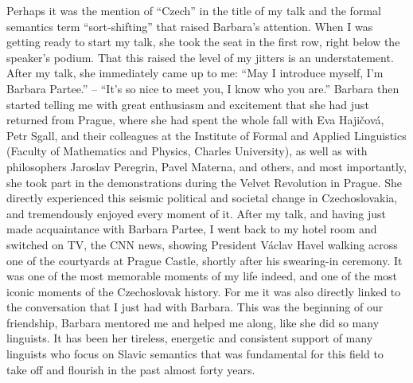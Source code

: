 \documentclass[output=paper]{langscibook}
\begin{document}
Perhaps it was the mention of ``Czech'' in the title of my talk and the formal
semantics term ``sort-shifting'' that raised Barbara's attention. When I was getting ready to start my talk, she took the seat in the first row, right below the speaker's podium. That this raised the level of my jitters is an understatement. 
After my talk, she immediately came up to me: 
``May I introduce myself, I'm Barbara Partee.'' -- ``It's so nice to meet you, I know who you are.''  Barbara then started telling me with great enthusiasm and excitement that she had just returned from Prague, 
where she had spent the whole fall with Eva Hajičová, Petr Sgall, and their colleagues 
at the Institute of Formal and Applied Linguistics (Faculty of Mathematics and Physics, Charles University), as well as with philosophers Jaroslav Peregrin, Pavel Materna, and others, and  most importantly, she took part in the demonstrations during the Velvet Revolution in Prague. 
She directly experienced this seismic political and societal change in Czechoslovakia, and tremendously
enjoyed every moment of it. After my talk, and having just made acquaintance with Barbara Partee, I went back to my hotel room and switched on TV, the CNN news, showing President
Václav Havel walking across one of the courtyards at Prague Castle,
shortly after his swearing-in ceremony. It was one of the most memorable
moments of my life indeed, and one of the most iconic moments of the Czechoslovak history.
For me it was also directly linked to the conversation that I just had with Barbara. 
This was the beginning of our friendship, Barbara mentored me 
and helped me along, like she did so many linguists. It has 
been her tireless, energetic and consistent support of many linguists who focus on Slavic semantics that was fundamental for this field to take off and flourish in the past almost forty years. 

\end{document}
